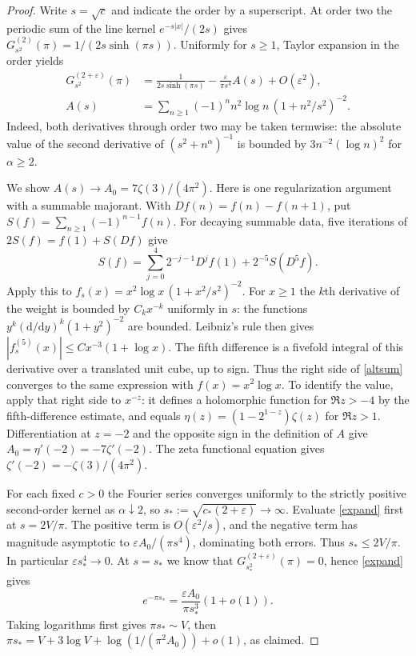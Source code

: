 \documentclass[11pt]{article}
\theoremstyle{plain}\newtheorem{theorem}{Theorem}[section]\newtheorem{lemma}[theorem]{Lemma}\newtheorem{corollary}[theorem]{Corollary}\newtheorem{proposition}[theorem]{Proposition}
\numberwithin{equation}{section}
\begin{document}
\begin{proof}
Write $s=\sqrt c$ and indicate the order by a superscript. At order two the periodic sum of the line kernel $e^{-s|x|}/(2s)$ gives $G^{(2)}_{s^2}(\pi)=1/(2s\sinh(\pi s))$. Uniformly for $s\ge1$, Taylor expansion in the order yields
\begin{align}
 G^{(2+\varepsilon)}_{s^2}(\pi)&=\frac1{2s\sinh(\pi s)}
          -\frac{\varepsilon}{\pi s^4}A(s)+O(\varepsilon^2),\label{expand}\\
 A(s)&=\sum_{n\ge1}(-1)^n n^2\log n\,(1+n^2/s^2)^{-2}.
\end{align}
Indeed, both derivatives through order two may be taken termwise: the absolute value of the second derivative of $(s^2+n^\alpha)^{-1}$ is bounded by $3n^{-2}(\log n)^2$ for $\alpha\ge2$.
  
We show $A(s)\to A_0=7\zeta(3)/(4\pi^2)$. Here is one regularization argument with a summable majorant. With $D f(n)=f(n)-f(n+1)$, put $S(f)=\sum_{n\ge1}(-1)^{n-1}f(n)$. For decaying summable data, five iterations of $2S(f)=f(1)+S(Df)$ give
\begin{equation}\label{altsum}
 S(f)=\sum_{j=0}^4 2^{-j-1}D^jf(1)+2^{-5}S(D^5 f).
\end{equation}
Apply this to $f_s(x)=x^2\log x\,(1+x^2/s^2)^{-2}$. For $x\ge1$ the $k$th derivative of the weight is bounded by $C_k x^{-k}$ uniformly in $s$: the functions $y^k(\mathrm d/\mathrm dy)^k(1+y^2)^{-2}$ are bounded. Leibniz's rule then gives $|f_s^{(5)}(x)|\le Cx^{-3}(1+\log x)$. The fifth difference is a fivefold integral of this derivative over a translated unit cube, up to sign. Thus the right side of \eqref{altsum} converges to the same expression with $f(x)=x^2\log x$. To identify the value, apply that right side to $x^{-z}$: it defines a holomorphic function for $\Re z>-4$ by the fifth-difference estimate, and equals $\eta(z)=(1-2^{1-z})\zeta(z)$ for $\Re z>1$. Differentiation at $z=-2$ and the opposite sign in the definition of $A$ give $A_0=\eta'(-2)=-7\zeta'(-2)$. The zeta functional equation gives $\zeta'(-2)=-\zeta(3)/(4\pi^2)$.
  
For each fixed $c>0$ the Fourier series converges uniformly to the strictly positive second-order kernel as $\alpha\downarrow2$, so $s_*:=\sqrt{c_*(2+\varepsilon)}\to\infty$. Evaluate \eqref{expand} first at $s=2V/\pi$. The positive term is $O(\varepsilon^2/s)$, and the negative term has magnitude asymptotic to $\varepsilon A_0/(\pi s^4)$, dominating both errors. Thus $s_*\le 2V/\pi$. In particular $\varepsilon s_*^4\to0$. At $s=s_*$ we know that $G^{(2+\varepsilon)}_{s_*^2}(\pi)=0$, hence \eqref{expand} gives
\[
  e^{-\pi s_*}=\frac{\varepsilon A_0}{\pi s_*^3}(1+o(1)).
\]
Taking logarithms first gives $\pi s_*\sim V$, then
$\pi s_*=V+3\log V+\log(1/(\pi^2 A_0))+o(1)$, as claimed.
\end{proof}
\end{document}
